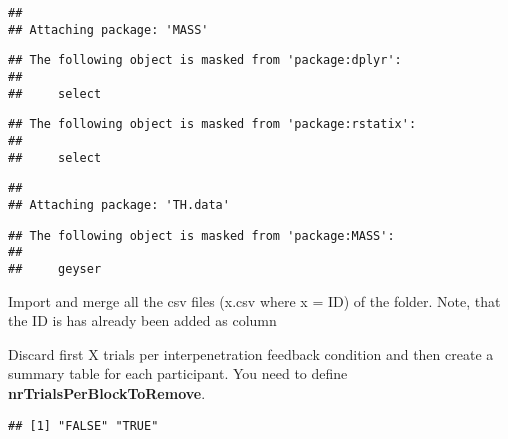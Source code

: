 \documentclass[
]{article}
\newenvironment{Shaded}{\begin{snugshade}}{\end{snugshade}}
\newcommand{\DecValTok}[1]{\textcolor[rgb]{0.00,0.00,0.81}{#1}}
\newcommand{\KeywordTok}[1]{\textcolor[rgb]{0.13,0.29,0.53}{\textbf{#1}}}
\newcommand{\NormalTok}[1]{#1}
\newcommand{\OperatorTok}[1]{\textcolor[rgb]{0.81,0.36,0.00}{\textbf{#1}}}
\newcommand{\StringTok}[1]{\textcolor[rgb]{0.31,0.60,0.02}{#1}}
\begin{document}
\begin{verbatim}
## 
## Attaching package: 'MASS'
\end{verbatim}

\begin{verbatim}
## The following object is masked from 'package:dplyr':
## 
##     select
\end{verbatim}

\begin{verbatim}
## The following object is masked from 'package:rstatix':
## 
##     select
\end{verbatim}

\begin{verbatim}
## 
## Attaching package: 'TH.data'
\end{verbatim}

\begin{verbatim}
## The following object is masked from 'package:MASS':
## 
##     geyser
\end{verbatim}

Import and merge all the csv files (x.csv where x = ID) of the folder.
Note, that the ID is has already been added as column

Discard first X trials per interpenetration feedback condition and then
create a summary table for each participant. You need to define
\textbf{nrTrialsPerBlockToRemove}.

\begin{Shaded}
\end{Shaded}

\begin{verbatim}
## [1] "FALSE" "TRUE"
\end{verbatim}
\end{document}
